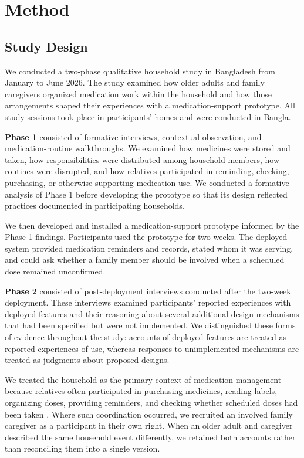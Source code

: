 \section{Method}

\subsection{Study Design}

We conducted a two-phase qualitative household study in Bangladesh from January to June 2026. The study examined how older adults and family caregivers organized medication work within the household and how those arrangements shaped their experiences with a medication-support prototype. All study sessions took place in participants' homes and were conducted in Bangla.

\textbf{Phase 1} consisted of formative interviews, contextual observation, and medication-routine walkthroughs. We examined how medicines were stored and taken, how responsibilities were distributed among household members, how routines were disrupted, and how relatives participated in reminding, checking, purchasing, or otherwise supporting medication use. We conducted a formative analysis of Phase 1 before developing the prototype so that its design reflected practices documented in participating households.

We then developed and installed a medication-support prototype informed by the Phase 1 findings. Participants used the prototype for two weeks. The deployed system provided medication reminders and records, stated whom it was serving, and could ask whether a family member should be involved when a scheduled dose remained unconfirmed.

\textbf{Phase 2} consisted of post-deployment interviews conducted after the two-week deployment. These interviews examined participants' reported experiences with deployed features and their reasoning about several additional design mechanisms that had been specified but were not implemented. We distinguished these forms of evidence throughout the study: accounts of deployed features are treated as reported experiences of use, whereas responses to unimplemented mechanisms are treated as judgments about proposed designs.

We treated the household as the primary context of medication management because relatives often participated in purchasing medicines, reading labels, organizing doses, providing reminders, and checking whether scheduled doses had been taken \cite{106}. Where such coordination occurred, we recruited an involved family caregiver as a participant in their own right. When an older adult and caregiver described the same household event differently, we retained both accounts rather than reconciling them into a single version.

